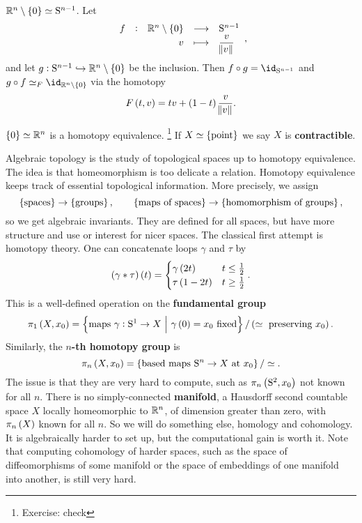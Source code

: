\begin{example*}
$ \RR^n \setminus \cbr{0} \simeq \S^{n - 1} $. Let
$$ \function[f]{\RR^n \setminus \cbr{0}}{\S^{n - 1}}{v}{\dfrac{v}{\norm{v}}}, $$
and let $ g : \S^{n - 1} \hookrightarrow \RR^n \setminus \cbr{0} $ be the inclusion. Then $ f \circ g = \id_{\S^{n - 1}} $ and $ g \circ f \simeq_F \id_{\RR^n \setminus \cbr{0}} $ via the homotopy
$$ F\br{t, v} = tv + \br{1 - t}\dfrac{v}{\norm{v}}. $$
\end{example*}

\begin{example*}
$ \cbr{0} \simeq \RR^n $ is a homotopy equivalence. \footnote{Exercise: check} If $ X \simeq \pt $ we say $ X $ is \textbf{contractible}.
\end{example*}

Algebraic topology is the study of topological spaces up to homotopy equivalence. The idea is that homeomorphism is too delicate a relation. Homotopy equivalence keeps track of essential topological information. More precisely, we assign
$$ \cbr{\text{spaces}} \to \cbr{\text{groups}}, \qquad \cbr{\text{maps of spaces}} \to \cbr{\text{homomorphism of groups}}, $$
so we get algebraic invariants. They are defined for all spaces, but have more structure and use or interest for nicer spaces. The classical first attempt is homotopy theory. One can concatenate loops $ \gamma $ and $ \tau $ by
$$ \br{\gamma * \tau}\br{t} =
\begin{cases}
\gamma\br{2t} & t \le \tfrac{1}{2} \\
\tau\br{1 - 2t} & t \ge \tfrac{1}{2}
\end{cases}.
$$
This is a well-defined operation on the \textbf{fundamental group}
$$ \pi_1\br{X, x_0} = \cbr{\text{maps} \ \gamma : \S^1 \to X \st \gamma\br{0} = x_0 \ \text{fixed}} / \br{\simeq \ \text{preserving} \ x_0}. $$
Similarly, the \textbf{$ n $-th homotopy group} is
$$ \pi_n\br{X, x_0} = \cbr{\text{based maps} \ \S^n \to X \ \text{at} \ x_0} / \simeq. $$
The issue is that they are very hard to compute, such as $ \pi_n\br{\S^2, x_0} $ not known for all $ n $. There is no simply-connected \textbf{manifold}, a Hausdorff second countable space $ X $ locally homeomorphic to $ \mathbb{R}^n $, of dimension greater than zero, with $ \pi_n\br{X} $ known for all $ n $. So we will do something else, homology and cohomology. It is algebraically harder to set up, but the computational gain is worth it. Note that computing cohomology of harder spaces, such as the space of diffeomorphisms of some manifold or the space of embeddings of one manifold into another, is still very hard.

